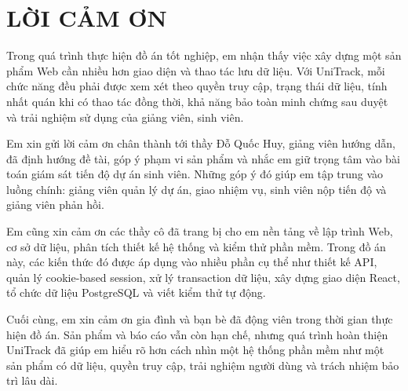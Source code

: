 \chapter*{LỜI CẢM ƠN}

Trong quá trình thực hiện đồ án tốt nghiệp, em nhận thấy việc xây dựng một sản phẩm Web cần nhiều hơn giao diện và thao tác lưu dữ liệu. Với UniTrack, mỗi chức năng đều phải được xem xét theo quyền truy cập, trạng thái dữ liệu, tính nhất quán khi có thao tác đồng thời, khả năng bảo toàn minh chứng sau duyệt và trải nghiệm sử dụng của giảng viên, sinh viên.

Em xin gửi lời cảm ơn chân thành tới thầy Đỗ Quốc Huy, giảng viên hướng dẫn, đã định hướng đề tài, góp ý phạm vi sản phẩm và nhắc em giữ trọng tâm vào bài toán giám sát tiến độ dự án sinh viên. Những góp ý đó giúp em tập trung vào luồng chính: giảng viên quản lý dự án, giao nhiệm vụ, sinh viên nộp tiến độ và giảng viên phản hồi.

Em cũng xin cảm ơn các thầy cô đã trang bị cho em nền tảng về lập trình Web, cơ sở dữ liệu, phân tích thiết kế hệ thống và kiểm thử phần mềm. Trong đồ án này, các kiến thức đó được áp dụng vào nhiều phần cụ thể như thiết kế API, quản lý cookie-based session, xử lý transaction dữ liệu, xây dựng giao diện React, tổ chức dữ liệu PostgreSQL và viết kiểm thử tự động.

Cuối cùng, em xin cảm ơn gia đình và bạn bè đã động viên trong thời gian thực hiện đồ án. Sản phẩm và báo cáo vẫn còn hạn chế, nhưng quá trình hoàn thiện UniTrack đã giúp em hiểu rõ hơn cách nhìn một hệ thống phần mềm như một sản phẩm có dữ liệu, quyền truy cập, trải nghiệm người dùng và trách nhiệm bảo trì lâu dài.
